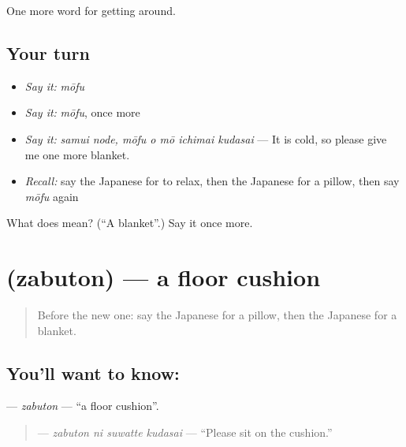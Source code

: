 \begin{grammarlens}[title={What you've built}]
One more word for getting around.
\end{grammarlens}

\subsection*{Your turn}
\begin{itemize}
\raggedright
  \item \emph{Say it:} \emph{mōfu}
  \item \emph{Say it:} \emph{mōfu}, once more
  \item \emph{Say it:} \emph{samui node, mōfu o mō ichimai kudasai} — It is cold, so please give me one more blanket.
  \item \emph{Recall:} say the Japanese for to relax, then the Japanese for a pillow, then say \emph{mōfu} again
\end{itemize}

\begin{tcolorbox}[breakable,colback=teal!4,colframe=teal!35!black,title={Before you move on}]
What does  mean? (\textquotedblleft{}A blanket\textquotedblright{}.) Say it once more.
\end{tcolorbox}
\section[\texorpdfstring{\ja{ざぶとん} (zabuton)}{ざぶとん (zabuton)}]{ (zabuton) — a floor cushion}

\label{lesson:JA-C399-zabuton}



\begin{quote}
Before the new one: say the Japanese for a pillow, then the Japanese for a blanket.
\end{quote}

\subsection*{You'll want to know: }
\textbf{} — \emph{zabuton} — \textquotedblleft{}a floor cushion\textquotedblright{}.

\begin{quote}
\textbf{  } — \emph{zabuton ni suwatte kudasai} — \textquotedblleft{}Please sit on the cushion.\textquotedblright{}
\end{quote}

